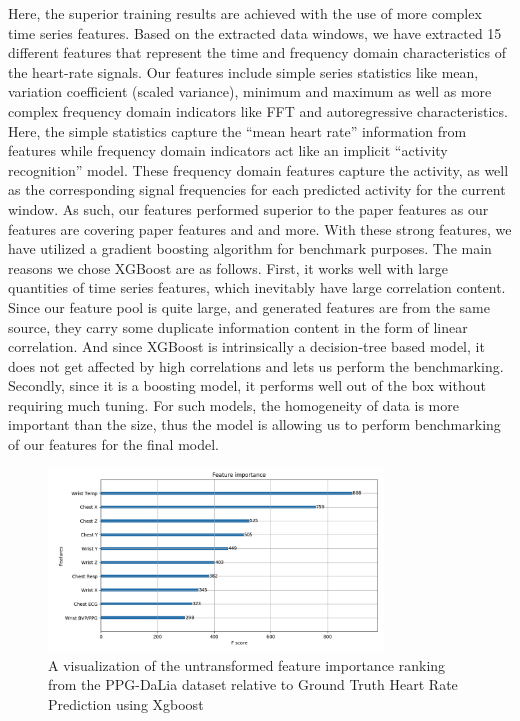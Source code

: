\documentclass[12pt, conference]{IEEEtran}
\begin{document}
Here, the superior training results are achieved with the use of more complex time series features. Based on the extracted data windows, we have extracted 15 different features that represent the time and frequency domain characteristics of the heart-rate signals. Our features include simple series statistics like mean, variation coefficient (scaled variance), minimum and maximum as well as more complex frequency domain indicators like FFT and autoregressive characteristics. Here, the simple statistics capture the “mean heart rate” information from features while frequency domain indicators act like an implicit “activity recognition” model. These frequency domain features capture the activity, as well as the corresponding signal frequencies for each predicted activity for the current window. As such, our features performed superior to the paper features as our features are covering paper features and and more.
With these strong features, we have utilized a gradient boosting algorithm for benchmark purposes. The main reasons we chose XGBoost are as follows. First, it works well with large quantities of time series features, which inevitably have large correlation content. Since our feature pool is quite large, and generated features are from the same source, they carry some duplicate information content in the form of linear correlation. And since XGBoost is intrinsically a decision-tree based model, it does not get affected by high correlations and lets us perform the benchmarking. Secondly, since it is a boosting model, it performs well out of the box without requiring much tuning. For such models, the homogeneity of data is more important than the size, thus the model is allowing us to perform benchmarking of our features for the final model.

\begin{figure}[!t]
\includegraphics[width=3.5in]{image1}
\caption{A visualization of the untransformed feature importance ranking from the PPG-DaLia dataset relative to Ground Truth Heart Rate Prediction using Xgboost}
\label{fig_2}
\end{figure}
\end{document}
